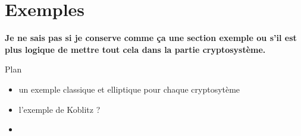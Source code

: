 \chapter{Exemples}
\textbf{Je ne sais pas si je conserve comme ça une section exemple ou s'il est plus logique
de mettre tout cela dans la partie cryptosystème.}

Plan
\begin{itemize}
    \item un exemple classique et elliptique pour chaque cryptosytème
    \item l'exemple de Koblitz ?
    \item
\end{itemize}
